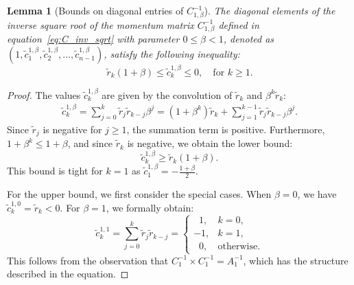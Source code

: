 \documentclass{article} %
\newtheorem{lemma}{Lemma}
\begin{document}
\begin{lemma}
[Bounds on diagonal entries of ${C}^{-1}_{1,\beta}$]
\label{lem:c_beta_bounds}
The diagonal elements of the inverse square root of the momentum matrix $C^{-1}_{1, \beta}$ defined in equation~\eqref{eq:C_inv_sqrt} with parameter $0 \leq \beta < 1$, denoted as $(1, \tilde{c}^{1, \beta}_1, \tilde{c}^{1, \beta}_2, \dots, \tilde{c}^{1, \beta}_{n - 1})$, satisfy the following inequality:
\begin{equation}
    \tilde{r}_k(1 + \beta) \leq \tilde{c}^{1, \beta}_k \leq 0, \quad \text{for } k \geq 1.
\end{equation}
\end{lemma}

\begin{proof}
The values $\tilde{c}^{1, \beta}_k$ are given by the convolution of $\tilde{r}_k$ and $\beta^k \tilde{r}_k$:
\begin{equation}
\begin{aligned}
    \tilde{c}^{1, \beta}_k = \sum\limits_{j = 0}^{k} \tilde{r}_j \tilde{r}_{k - j} \beta^j = (1 + \beta^k)\tilde{r}_k + \sum\limits_{j = 1}^{k-1} \tilde{r}_j \tilde{r}_{k - j} \beta^j.
\end{aligned}
\end{equation}
Since $\tilde{r}_j$ is negative for $j \geq 1$, the summation term is positive. Furthermore, $1 + \beta^k \leq 1 + \beta$, and since $\tilde{r}_k$ is negative, we obtain the lower bound:
\begin{equation}
    \tilde{c}^{1, \beta}_k \geq \tilde{r}_k (1 + \beta).
\end{equation}
This bound is tight for $k = 1$ as $\tilde{c}^{1, \beta}_1 = - \frac{1 + \beta}{2}$.

For the upper bound, we first consider the special cases. When $\beta = 0$, we have $\tilde{c}^{1, 0}_k = \tilde{r}_k < 0$. For $\beta = 1$, we formally obtain:
\begin{equation}
    \tilde{c}^{1, 1}_k = \sum\limits_{j = 0}^{k} \tilde{r}_j \tilde{r}_{k - j} = 
    \begin{cases}
        \;\;1, & k = 0,\\
        -1, & k = 1,\\
        \;\;0, & \text{otherwise}.
    \end{cases}
\end{equation}
This follows from the observation that $C_1^{-1} \times C_1^{-1} = A_1^{-1}$, which has the structure described in the equation.


\end{proof}
\end{document}
